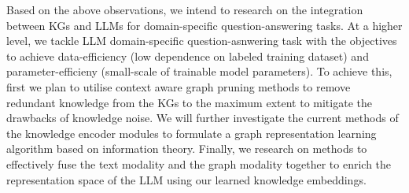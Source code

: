 Based on the above observations, we intend to research on the integration between KGs and LLMs for domain-specific question-answering tasks. 
At a higher level, we tackle LLM domain-specific question-asnwering task with the objectives to achieve data-efficiency (low dependence on labeled training dataset) and parameter-efficieny (small-scale of trainable model parameters).
To achieve this, first we plan to utilise context aware graph pruning methods to remove redundant knowledge from the KGs to the maximum extent to mitigate the drawbacks of knowledge noise. 
We will further investigate the current methods of the knowledge encoder modules to formulate a graph representation learning algorithm based on information theory. 
Finally, we research on methods to effectively fuse the text modality and the graph modality together to enrich the representation space of the LLM using our learned knowledge embeddings.
